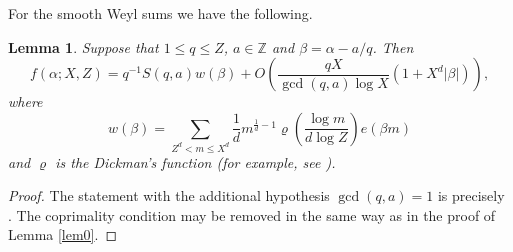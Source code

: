 \documentclass[reqno, 12pt, reqno]{amsart}
\numberwithin{equation}{section}
\newtheorem{lemma}[theorem]{Lemma}
\newcommand{\ZZ}{\mathbb{Z}}
\renewcommand{\leq}{\leqslant}
\renewcommand{\=}{\equiv}
\begin{document}
For the smooth Weyl sums we have the following.
\begin{lemma}
\label{lem1}
Suppose that $1 \leq q \leq Z$, $a \in \ZZ$ and $\beta = \alpha - a/q$.
Then
$$
f(\alpha; X, Z) = q^{-1} S(q,a) w(\beta) + O \left(  \frac{q X}{\gcd(q,a) \log X}   (1 + X^d |\beta|) \right),
$$
where
$$
w(\beta) = \sum_{Z^d < m \leq X^d} \frac{1}{d} m^{ \frac{1}{d} - 1 } \varrho \left(  \frac{\log m}{ d \log Z}  \right)  e(\beta m)
$$
and $\varrho$ is the Dickman's function (for example, see \cite[pp.53]{Va89}).
\end{lemma}
\begin{proof}
The statement with the additional hypothesis $\gcd(q,a) = 1$ is precisely \cite[Lemma 5.4]{Va89}.
The coprimality condition may be removed in the same way as in the proof of Lemma \ref{lem0}.
\end{proof}
\end{document}
